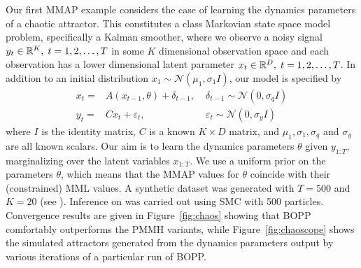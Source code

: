 Our first MMAP example considers the case of learning the dynamics parameters of a chaotic attractor.  
This constitutes a class Markovian state space model problem, specifically a Kalman smoother,
where we observe a noisy signal 
$y_t \in \mathbb{R}^{K}, \; t = 1,2,\dots,T$ in some $K$ dimensional observation space and each 
observation has a lower dimensional latent parameter $x_t \in \mathbb{R}^{D},  \; t = 1,2,\dots,T$.
In addition to an initial distribution $x_1 \sim \mathcal{N} \left(\mu_1, \sigma_1 I\right)$, our model is specified by 
\begin{subequations}
	\label{eq:Kalman}
\begin{align}
x_t = & A \left(x_{t-1}, \theta\right)+\delta_{t-1}, \; & \delta_{t-1} \sim \mathcal{N} \left(0, \sigma_q I\right) \\
y_t = & C x_{t}+\varepsilon_{t}, \; & \varepsilon_{t} \sim \mathcal{N} \left(0, \sigma_y I\right)
\end{align}
\end{subequations}
where $I$ is the identity matrix, $C$ is a known $K \times D$ matrix, and $\mu_1,\sigma_1, \sigma_q$ 
and $\sigma_y$ are all known scalars.  Our aim is to learn the dynamics parameters $\theta$ given
$y_{1:T}$, marginalizing over the latent variables $x_{1:T}$.  We use
a uniform prior on the parameters $\theta$, which means that the MMAP values for $\theta$
coincide with their (constrained) MML values.  A synthetic dataset was generated with $T=500$ and
$K=20$ (see \cite{rainforth2017boppArxiv}).
Inference on \qmarg was carried out using SMC with 500 particles.  
Convergence results are given in Figure~\ref{fig:chaos} showing that BOPP comfortably 
outperforms the PMMH variants, while Figure~\ref{fig:chaoscope} shows the simulated 
attractors generated from the dynamics parameters output by various iterations of a 
particular run of BOPP.
